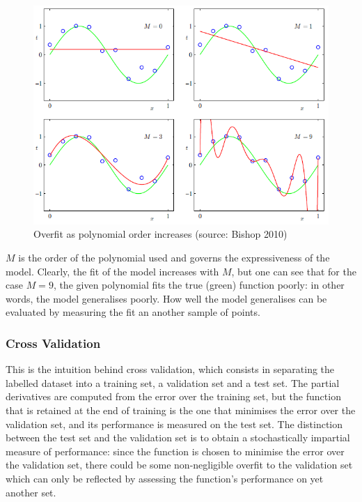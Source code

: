 \documentclass[a4paper,11pt]{article}
\begin{document}
\begin{figure}[h!]
	\centering
	\includegraphics[scale=0.8]{images/overfit.png}
	\caption{Overfit as polynomial order increases (source: Bishop 2010)}
\end{figure}

$M$ is the order of the polynomial used and governs the expressiveness of the model. Clearly, the fit of the model increases with $M$, but one can see that for the case $M = 9$, the given polynomial fits the true (green) function poorly: in other words, the model generalises poorly. How well the model generalises can be evaluated by measuring the fit an another sample of points. \\

\subsubsection{Cross Validation}

This is the intuition behind cross validation, which consists in separating the labelled dataset into a training set, a validation set and a test set. The partial derivatives are computed from the error over the training set, but the function that is retained at the end of training is the one that minimises the error over the validation set, and its performance is measured on the test set. The distinction between the test set and the validation set is to obtain a stochastically impartial measure of performance: since the function is chosen to minimise the error over the validation set, there could be some non-negligible overfit to the validation set which can only be reflected by assessing the function's performance on yet another set. \\
\end{document}
